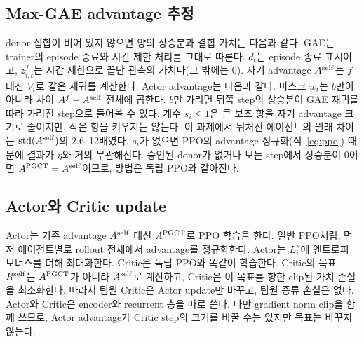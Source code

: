 \documentclass[10pt,twocolumn,letterpaper]{article}
\begin{document}
\subsection{Max-GAE advantage 추정}
donor 집합이 비어 있지 않으면 양의 상승분과 결합 가치는 다음과 같다.
\MaxEquation
GAE는 trainer의 episode 종료와 시간 제한 처리를 그대로 따른다.
\GAEEquation
$d_t$는 episode 종료 표시이고, $z^f_{i,t}$는 시간 제한으로 끝난 관측의 가치다(그 밖에는 0). 자기 advantage $A^{\rm self}$는 $f$ 대신 $V_i$로 같은 재귀를 계산한다. Actor advantage는 다음과 같다.
\BlendEquation
마스크 $w_t$는 $b$만이 아니라 차이 $A^f-A^{\rm self}$ 전체에 곱한다. $b$만 가리면 뒤쪽 step의 상승분이 GAE 재귀를 따라 가려진 step으로 들어올 수 있다. 계수 $s_i\le1$은 큰 보조 항을 자기 advantage 크기로 줄이지만, 작은 항을 키우지는 않는다. 이 과제에서 뒤처진 에이전트의 원래 차이는 $\operatorname{std}(A^{\rm self})$의 2.6--12배였다. $s_i$가 없으면 PPO의 advantage 정규화(식~\ref{eq:ppo}) 때문에 결과가 $\eta$와 거의 무관해진다. 승인된 donor가 없거나 모든 step에서 상승분이 0이면 $A^{\rm PGCT}=A^{\rm self}$이므로, 방법은 독립 PPO와 같아진다.

\subsection{Actor와 Critic update}
Actor는 기존 advantage $A^{\rm self}$ 대신 $A^{\rm PGCT}$로 PPO 학습을 한다. 일반 PPO처럼, 먼저 에이전트별로 rollout 전체에서 advantage를 정규화한다.
\PPOEquation
Actor는 $L_i^\pi$에 엔트로피 보너스를 더해 최대화한다. Critic은 독립 PPO와 똑같이 학습한다. Critic의 목표 $R^{\rm self}$는 $A^{\rm PGCT}$가 아니라 $A^{\rm self}$로 계산하고, Critic은 이 목표를 향한 clip된 가치 손실을 최소화한다. 따라서 팀원 Critic은 Actor update만 바꾸고, 팀원 증류 손실은 없다. Actor와 Critic은 encoder와 recurrent 층을 따로 쓴다. 다만 gradient norm clip을 함께 쓰므로, Actor advantage가 Critic step의 크기를 바꿀 수는 있지만 목표는 바꾸지 않는다.
\end{document}

